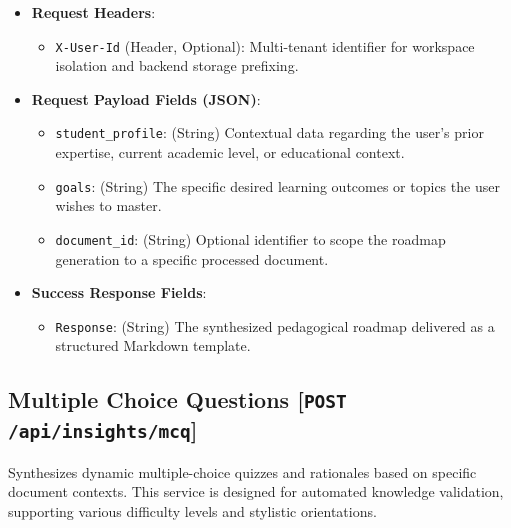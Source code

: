 \begin{itemize}
    \item \textbf{Request Headers}:
    \begin{itemize}
        \item \texttt{X-User-Id} (Header, Optional): Multi-tenant identifier for workspace isolation and backend storage prefixing.
    \end{itemize}
    \item \textbf{Request Payload Fields (JSON)}:
    \begin{itemize}
        \item \texttt{student\_profile}: (String) Contextual data regarding the user's prior expertise, current academic level, or educational context.
        \item \texttt{goals}: (String) The specific desired learning outcomes or topics the user wishes to master.
        \item \texttt{document\_id}: (String) Optional identifier to scope the roadmap generation to a specific processed document.
    \end{itemize}
    \item \textbf{Success Response Fields}:
    \begin{itemize}
        \item \texttt{Response}: (String) The synthesized pedagogical roadmap delivered as a structured Markdown template.
    \end{itemize}
\end{itemize}

\subsection{Multiple Choice Questions [\texttt{POST} \texttt{/api/insights/mcq}]}
Synthesizes dynamic multiple-choice quizzes and rationales based on specific document contexts. This service is designed for automated knowledge validation, supporting various difficulty levels and stylistic orientations.

